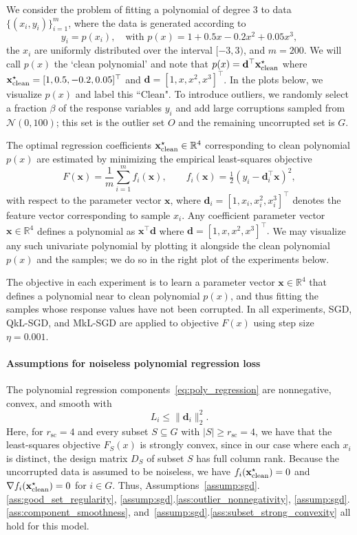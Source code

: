 \documentclass[11pt]{article}
\newcommand{\ve}[1]{\mathbf{#1}}
\begin{document}
We consider the problem of fitting a polynomial of degree $3$ to data $\{(x_i, y_i)\}_{i=1}^m$, where the data is generated according to
\[
y_i = p(x_i), \quad \text{with } p(x) = 1 + 0.5x - 0.2x^2 + 0.05x^3,
\]
the $x_i$ are uniformly distributed over the interval $[-3,3)$, and $m=200$.
We will call $p(x)$ the `clean polynomial' and note that $p(x) = \ve{d}^\top \ve{x}^\star_{\rm clean}$ where $\ve{x}^\star_{\rm clean} = [1, 0.5, -0.2, 0.05]^\top$ and $\ve{d} = [1, x, x^2, x^3]^\top$. In the plots below, we visualize $p(x)$ and label this ``Clean".
To introduce outliers, we randomly select a fraction $\beta$ of the response variables $y_i$ and add large corruptions sampled from $\mathcal{N}(0,100)$; this set is the outlier set $O$ and the remaining uncorrupted set is $G$.

The optimal regression coefficients $\ve{x}^\star_{\rm clean} \in \mathbb{R}^{4}$ corresponding to clean polynomial $p(x)$ are estimated by minimizing the empirical least-squares objective
\begin{equation}
F(\ve{x}) = \frac{1}{m} \sum_{i=1}^m f_i(\ve{x}), \qquad f_i(\ve{x}) = \tfrac{1}{2}(y_i - \ve{d}_i^\top \ve{x})^2, \label{eq:poly_regression}
\end{equation}
with respect to the parameter vector $\ve{x}$, where $\ve{d}_i = [1, x_i, x_i^2, x_i^3]^\top$ denotes the feature vector corresponding to sample $x_i$. Any coefficient parameter vector $\ve{x} \in \mathbb{R}^4$ defines a polynomial as $\ve{x}^\top \ve{d}$ where $\ve{d} = [1, x, x^2, x^3]^\top.$  We may visualize any such univariate polynomial by plotting it alongside the clean polynomial $p(x)$ and the samples; we do so in the right plot of the experiments below.

The objective in each experiment is to learn a parameter vector $\ve{x} \in \mathbb{R}^4$ that defines a polynomial near to clean polynomial $p(x)$, and thus fitting the samples whose response values have not been corrupted.  In all experiments, SGD, QkL-SGD, and MkL-SGD are applied to objective $F(x)$ using step size $\eta = 0.001$.

\paragraph{Assumptions for noiseless polynomial regression loss}\label{subsubsec:noiselesspolyregression_assumptions}

The polynomial regression components~\eqref{eq:poly_regression} are nonnegative, convex, and smooth with $$L_i \le \|\ve{d}_i\|_2^2.$$  Here, for $r_{\mathrm{sc}} = 4$ and every subset $S \subseteq G$ with $|S| \ge r_{\mathrm{sc}} = 4$, we have that the least-squares objective $F_S(x)$ is strongly convex, since in our case where each $x_i$ is distinct, the design matrix $D_S$ of subset $S$ has full column rank.  Because the uncorrupted data is assumed to be noiseless, we have $f_i(\ve{x}^\star_{\rm clean}) = 0$ and
     $\nabla f_i(\ve{x}^\star_{\rm clean}) = 0$ for $i \in G$.  Thus, Assumptions~\ref{assump:sgd}.\ref{ass:good_set_regularity}, \ref{assump:sgd}.\ref{ass:outlier_nonnegativity}, \ref{assump:sgd}.\ref{ass:component_smoothness}, and~\ref{assump:sgd}.\ref{ass:subset_strong_convexity} all hold for this model.
\end{document}

